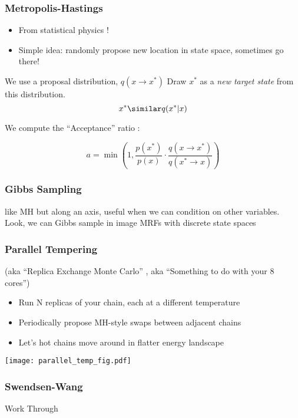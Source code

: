 \documentclass{beamer}
\begin{document}
\begin{frame}
  \frametitle{Metropolis-Hastings}
  \begin{itemize}
    \item From statistical physics   \cite{Metropolis_Equation_1953}! 

    \item Simple idea: randomly propose new location in state space, 
      sometimes go there! 
    \end{itemize}

  We use a proposal distribution, $q(x \rightarrow x^\ast)$ 
  Draw $x^\ast$ as a \textit{new target state} from this distribution. 
  \begin{equation*}
    x^\ast  \similar q(x^\ast | x)
  \end{equation*}

  We compute the ``Acceptance'' ratio : 
  
  \begin{equation*}
    a = \min (1, \frac{p(x^\ast)}{p(x)} \cdot 
  \frac{q(x \rightarrow x^\ast)}{q(x^\ast \rightarrow x)})
  \end{equation*}


\end{frame}

\begin{frame}
  \frametitle{Gibbs Sampling}
  like MH but along an axis, useful when we can condition
  on other variables. 
  Look, we can Gibbs sample in image MRFs with discrete state spaces
  \cite{Geman_Stochastic_1990}
\end{frame}

\begin{frame}
  \frametitle{Parallel Tempering} 
  (aka ``Replica Exchange Monte Carlo'' \cite{Swendsen_Replica_1986}, aka ``Something to do with your 8 cores'')
  \begin{itemize}
  \item Run N replicas of your chain, each at a different temperature
  \item Periodically propose MH-style swaps between adjacent chains
  \item Let's hot chains move around in flatter energy landscape
  \end{itemize}
  \texttt{[image: parallel\_temp\_fig.pdf]}
\end{frame}

\begin{frame}
  \frametitle{Swendsen-Wang}
  Work Through
\end{frame}
\end{document}
